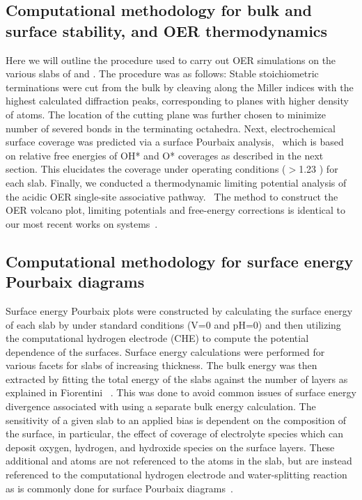 \subsection{Computational methodology for bulk and surface stability, and OER thermodynamics}
%
%
Here we will outline the procedure used to carry out OER simulations on the various slabs of \IrOtwo and \IrOthree.
%
The procedure was as follows:
%
Stable stoichiometric terminations were cut from the bulk by cleaving along the Miller indices with the highest calculated diffraction peaks, corresponding to planes with higher density of atoms. The location of the cutting plane was further chosen to minimize number of severed bonds in the terminating octahedra.
%
Next, electrochemical surface coverage was predicted via a surface Pourbaix analysis,~\cite{Lu2017}
which is based on relative free energies of OH* and O* coverages as described in the next section.
%
This elucidates the coverage under operating conditions ($>$\num{1.23} \VRHE) for each slab.
%
Finally, we conducted a thermodynamic limiting potential analysis of the acidic OER single-site associative pathway.~\cite{Rossmeisl2007, Man2011, Friebel2015,  Seitz2016, Strickler2019}
%
The method to construct the OER volcano plot, limiting potentials and free-energy corrections is identical to our most recent works on \IrOtwo systems~\cite{Strickler2019,Lee2020}.


\subsection{Computational methodology for surface energy Pourbaix diagrams}
%
%
Surface energy Pourbaix plots were constructed by calculating the surface energy of each slab by under standard conditions (\si{\volt}\num{=0} and pH\num{=0}) and then utilizing the computational hydrogen electrode (CHE) to compute the potential dependence of the surfaces.
%
Surface energy calculations were performed for various facets for slabs of increasing thickness.
%
The bulk energy was then extracted by fitting the total energy of the slabs against the number of layers as explained in Fiorentini ~\cite{Boettger1998}.
%
This was done to avoid common issues of surface energy divergence associated with using a separate bulk energy calculation.
%
The sensitivity of a given slab to an applied bias is dependent on the composition of the surface,
in particular, the effect of coverage of electrolyte species which can deposit oxygen, hydrogen, and hydroxide species on the surface layers.
%
These additional  and  atoms are not referenced to the atoms in the slab, but are instead referenced to the computational hydrogen electrode and water-splitting reaction as is commonly done for surface Pourbaix diagrams~\cite{Lu2017}.

